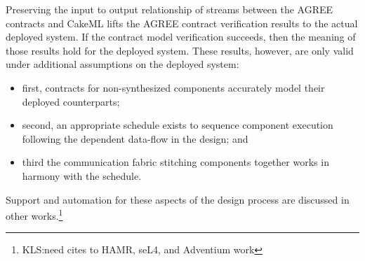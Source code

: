 Preserving the input to output relationship of streams between the
AGREE contracts and CakeML lifts the AGREE contract verification
results to the actual deployed system.  If the contract model
verification succeeds, then the meaning of those results hold for the
deployed system.  These results, however, are only valid under
additional assumptions on the deployed system:
\begin{itemize}
\item first, contracts for non-synthesized components accurately model their deployed
counterparts;
\item second, an appropriate schedule exists to sequence component
  execution following the dependent data-flow in the design; and
\item third the communication fabric stitching components together works in harmony
  with the schedule.
\end{itemize}
\noindent Support and automation for these aspects of the design process are
discussed in other works.\footnote{KLS:need cites to HAMR, seL4, and Adventium work}
